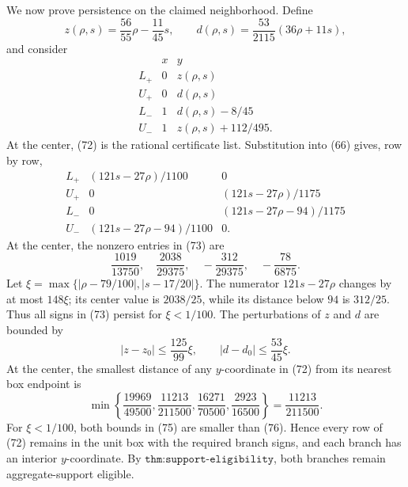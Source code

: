 We now prove persistence on the claimed neighborhood.  Define
\[
 z(\rho,s)=\frac{56}{55}\rho-\frac{11}{45}s,
 \qquad
 d(\rho,s)=\frac{53}{2115}(36\rho+11s),                                      \tag{71}
\]
and consider
\[
\begin{array}{c|cc}
&x&y\\ \hline
L_+&0&z(\rho,s)\\
U_+&0&d(\rho,s)\\
L_-&1&d(\rho,s)-8/45\\
U_-&1&z(\rho,s)+112/495.
\end{array}                                                                   \tag{72}
\]
At the center, (72) is the rational certificate list.  Substitution into (66) gives, row by row,
\[
 \begin{array}{c|cc}
 L_+&(121s-27\rho)/1100&0\\
 U_+&0&(121s-27\rho)/1175\\
 L_-&0&(121s-27\rho-94)/1175\\
 U_-&(121s-27\rho-94)/1100&0.
 \end{array}                                                                  \tag{73}
\]
At the center, the nonzero entries in (73) are
\[
 \frac{1019}{13750},\quad
 \frac{2038}{29375},\quad
 -\frac{312}{29375},\quad
 -\frac{78}{6875}.                                                           \tag{74}
\]
Let \(\xi=\max\{|\rho-79/100|,|s-17/20|\}\).  The numerator \(121s-27\rho\) changes by at most \(148\xi\); its center value is \(2038/25\), while its distance below \(94\) is \(312/25\).  Thus all signs in (73) persist for \(\xi<1/100\).  The perturbations of \(z\) and \(d\) are bounded by
\[
 |z-z_0|\le\frac{125}{99}\xi,
 \qquad
 |d-d_0|\le\frac{53}{45}\xi.                                                \tag{75}
\]
At the center, the smallest distance of any \(y\)-coordinate in (72) from its nearest box endpoint is
\[
 \min\left\{\frac{19969}{49500},\frac{11213}{211500},
              \frac{16271}{70500},\frac{2923}{16500}\right\}
 =\frac{11213}{211500}.                                                       \tag{76}
\]
For \(\xi<1/100\), both bounds in (75) are smaller than (76).  Hence every row of (72) remains in the unit box with the required branch signs, and each branch has an interior \(y\)-coordinate.  By \(\texttt{thm:support-eligibility}\), both branches remain aggregate-support eligible.

